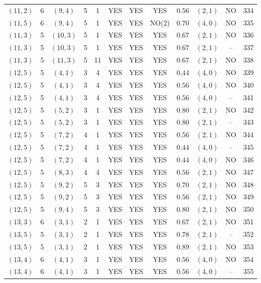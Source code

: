 \begin{longtable}{|c|c|c|c|c|c|c|c|c|c|c|c|}
$(11,2)$ & 6 & $(9,4)$ & 5 & 1 & YES & YES & YES & $0.56$ & $(2,1)$ & NO & 334\\
$(11,5)$ & 6 & $(9,4)$ & 5 & 1 & YES & YES & NO(2) & $0.70$ & $(4,0)$ & NO & 335\\
$(11,3)$ & 5 & $(10,3)$ & 5 & 1 & YES & YES & YES & $0.67$ & $(2,1)$ & NO & 336\\
$(11,3)$ & 5 & $(10,3)$ & 5 & 1 & YES & YES & YES & $0.67$ & $(2,1)$ & -- & 337\\
$(11,3)$ & 5 & $(11,3)$ & 5 & 11 & YES & YES & YES & $0.67$ & $(2,1)$ & NO & 338\\
$(12,5)$ & 5 & $(4,1)$ & 3 & 4 & YES & YES & YES & $0.44$ & $(4,0)$ & NO & 339\\
$(12,5)$ & 5 & $(4,1)$ & 3 & 4 & YES & YES & YES & $0.56$ & $(4,0)$ & NO & 340\\
$(12,5)$ & 5 & $(4,1)$ & 3 & 4 & YES & YES & YES & $0.56$ & $(4,0)$ & -- & 341\\
$(12,5)$ & 5 & $(5,2)$ & 3 & 1 & YES & YES & YES & $0.80$ & $(2,1)$ & NO & 342\\
$(12,5)$ & 5 & $(5,2)$ & 3 & 1 & YES & YES & YES & $0.80$ & $(2,1)$ & -- & 343\\
$(12,5)$ & 5 & $(7,2)$ & 4 & 1 & YES & YES & YES & $0.56$ & $(2,1)$ & NO & 344\\
$(12,5)$ & 5 & $(7,2)$ & 4 & 1 & YES & YES & YES & $0.44$ & $(4,0)$ & -- & 345\\
$(12,5)$ & 5 & $(7,2)$ & 4 & 1 & YES & YES & YES & $0.44$ & $(4,0)$ & NO & 346\\
$(12,5)$ & 5 & $(8,3)$ & 4 & 4 & YES & YES & YES & $0.56$ & $(2,1)$ & NO & 347\\
$(12,5)$ & 5 & $(9,2)$ & 5 & 3 & YES & YES & YES & $0.70$ & $(2,1)$ & NO & 348\\
$(12,5)$ & 5 & $(9,2)$ & 5 & 3 & YES & YES & YES & $0.56$ & $(2,1)$ & NO & 349\\
$(12,5)$ & 5 & $(9,4)$ & 5 & 3 & YES & YES & YES & $0.80$ & $(2,1)$ & NO & 350\\
$(13,3)$ & 6 & $(3,1)$ & 2 & 1 & YES & YES & YES & $0.67$ & $(2,1)$ & NO & 351\\
$(13,5)$ & 5 & $(3,1)$ & 2 & 1 & YES & YES & YES & $0.78$ & $(2,1)$ & -- & 352\\
$(13,5)$ & 5 & $(3,1)$ & 2 & 1 & YES & YES & YES & $0.89$ & $(2,1)$ & NO & 353\\
$(13,4)$ & 6 & $(4,1)$ & 3 & 1 & YES & YES & YES & $0.56$ & $(4,0)$ & NO & 354\\
$(13,4)$ & 6 & $(4,1)$ & 3 & 1 & YES & YES & YES & $0.56$ & $(4,0)$ & -- & 355\\

\end{longtable}
